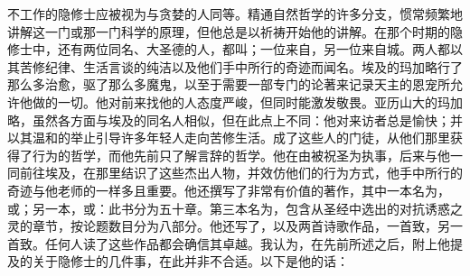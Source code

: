 {不工作的隐修士应被视为与贪婪的人同等。}精通自然哲学的许多分支，惯常频繁地讲解这一门或那一门科学的原理，但他总是以祈祷开始他的讲解。在那个时期的隐修士中，还有两位同名、大圣德的人，都叫；一位来自，另一位来自城。两人都以其苦修纪律、生活言谈的纯洁以及他们手中所行的奇迹而闻名。埃及的玛加略行了那么多治愈，驱了那么多魔鬼，以至于需要一部专门的论著来记录天主的恩宠所允许他做的一切。他对前来找他的人态度严峻，但同时能激发敬畏。亚历山大的玛加略，虽然各方面与埃及的同名人相似，但在此点上不同：他对来访者总是愉快；并以其温和的举止引导许多年轻人走向苦修生活。成了这些人的门徒，从他们那里获得了行为的哲学，而他先前只了解言辞的哲学。他在由被祝圣为执事，后来与他一同前往埃及，在那里结识了这些杰出人物，并效仿他们的行为方式，他手中所行的奇迹与他老师的一样多且重要。他还撰写了非常有价值的著作，其中一本名为，或；另一本，或：此书分为五十章。第三本名为，包含从圣经中选出的对抗诱惑之灵的章节，按论题数目分为八部分。他还写了，以及两首诗歌作品，一首致，另一首致。任何人读了这些作品都会确信其卓越。我认为，在先前所述之后，附上他提及的关于隐修士的几件事，在此并非不合适。以下是他的话：\par

